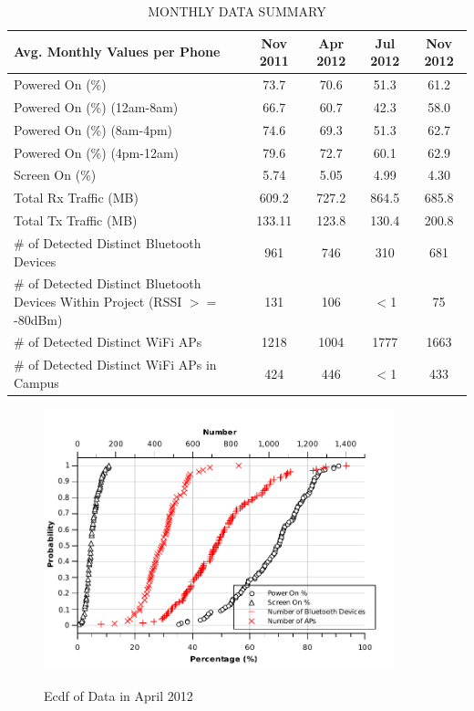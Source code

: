 \begin{table}[tb] 
\caption{MONTHLY DATA SUMMARY} 
\centering
\begin{tabular}{p{6cm}|c|c|c|c}
\hline
		  Avg. Monthly Values per Phone							& Nov 2011 & Apr 2012 & Jul 2012 & Nov 2012 \\ [0.5ex] 
\hline\hline Powered On (\%) 										& 73.7 	   & 70.6 	      & 51.3 	& 61.2		\\ 
\hline	  Powered On (\%) (12am-8am) 							&  66.7	    & 60.7 		& 42.3 	& 58.0 \\
\hline 	  Powered On (\%) (8am-4pm) 								& 74.6 	   & 69.3 	      & 51.3 	& 62.7 \\
\hline 	  Powered On (\%) (4pm-12am)   			 				& 79.6	    & 72.7 		& 60.1 	& 62.9 \\
\hline	  Screen On (\%)										&  5.74	    & 5.05 		& 4.99 	& 4.30 \\
\hline	  Total Rx Traffic  (MB)									&  609.2	    & 727.2 	& 864.5 	& 685.8 \\
\hline	  Total Tx Traffic  (MB)									&  133.11	    & 123.8 	& 130.4 	& 200.8 \\
\hline 	  \# of Detected Distinct Bluetooth Devices					&  961 	     & 746 		& 310 	& 681	 \\
\hline 	  \# of Detected Distinct Bluetooth Devices Within Project (RSSI $>=$ -80dBm) 	&  131 	     & 106 		 & 	$<$1 & 75	 \\
\hline	  \# of Detected Distinct WiFi APs 										&  1218 	     & 1004	 	& 1777 	& 1663 \\
\hline	  \# of Detected Distinct WiFi APs in Campus 								&  424 	     & 446	 	& $<$1 	& 433 \\
\hline
\end{tabular}
\label{table:summary} 
\end{table}

\begin{figure}[tbp]
\centering 
{\includegraphics[width=4in]{graphs/num_cdf.pdf}}
\caption{Ecdf of Data in April 2012} 
\label{fig:num_cdf}
\end{figure} 

